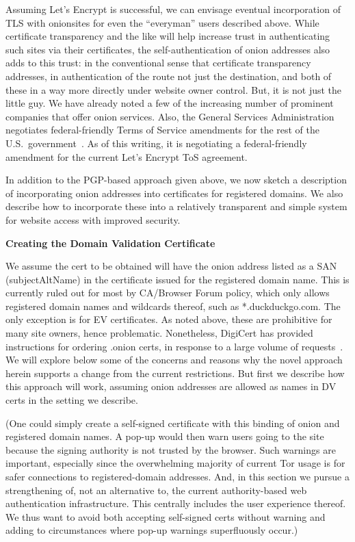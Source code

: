 \documentclass[10pt]{styles/IEEEtran}
\newcommand{\point}[1]{\vspace{2mm} \noindent\textbf{#1}}
\begin{document}
Assuming Let's Encrypt is successful, we can envisage eventual
incorporation of TLS with onionsites for even the ``everyman'' users
described above.  While certificate transparency and the like will
help increase trust in authenticating such sites via their
certificates, the self-authentication of onion addresses also adds to
this trust: in the conventional sense that certificate transparency
addresses, in authentication of the route not just the destination,
and both of these in a way more directly under website owner control. 
But, it is not just the little guy. We have already noted a few of the
increasing number of prominent companies that offer onion
services. Also, the General Services Administration negotiates
federal-friendly Terms of Service amendments for the rest of the U.S.\
government~\cite{gsa-tos}. As of this writing, it is negotiating a
federal-friendly amendment for the current Let's Encrypt ToS
agreement.

In addition to the PGP-based approach given above,
we now sketch a description of incorporating onion addresses into
certificates for registered domains. We also describe how to
incorporate these into a relatively transparent and simple system for
website access with improved security. 

\point{Creating the Domain Validation Certificate}

We assume the cert to be obtained will have the onion address listed
as a SAN (subjectAltName) in the certificate issued for the registered
domain name.  This is currently ruled out for most by CA/Browser Forum policy,
which only allows registered domain names and wildcards thereof, such
as *.duckduckgo.com. The only exception is for EV
certificates.  As noted above, these are prohibitive for many site
owners, hence problematic. Nonetheless, DigiCert has provided instructions
for ordering .onion certs, in response to a large volume of
requests~\cite{digicert-onion-blog}.
We will explore below some of the concerns
and reasons why the novel approach herein supports a change from the
current restrictions.
But first we describe how this approach will work, assuming
onion addresses are allowed as names in DV certs in the setting
we describe.

(One could simply create a self-signed certificate with this binding of
onion and registered domain names. A pop-up would then warn users
going to the site because the signing authority is not trusted by the
browser.  Such warnings are important, especially since the
overwhelming majority of current Tor usage is for safer connections to
registered-domain addresses. And, in this section we pursue a
strengthening of, not an alternative to, the current authority-based
web authentication infrastructure. This centrally includes the user
experience thereof. We thus want to avoid both accepting self-signed
certs without warning and adding to circumstances where pop-up
warnings superfluously occur.)
\end{document}
